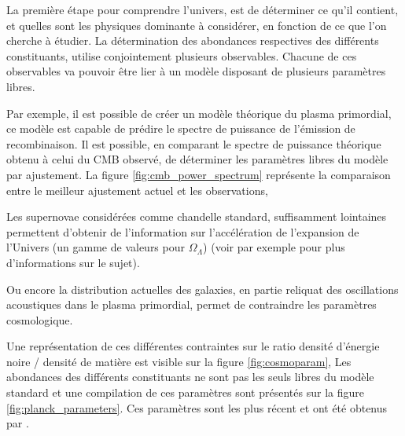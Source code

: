 La première étape pour comprendre l'univers, est de déterminer ce qu'il contient, et quelles sont les physiques dominante à considérer, en fonction de ce que l'on cherche à étudier.
La détermination des abondances respectives des différents constituants, utilise conjointement plusieurs observables.
Chacune de ces observables va pouvoir être lier à un modèle disposant de plusieurs paramètres libres.

Par exemple, il est possible de créer un modèle théorique du plasma primordial, ce modèle est capable de prédire le spectre de puissance de l'émission de recombinaison.
Il est possible, en comparant le spectre de puissance théorique obtenu à celui du \ac{CMB} observé, de déterminer les paramètres libres du modèle par ajustement.
La figure \ref{fig:cmb_power_spectrum} représente la comparaison entre le meilleur ajustement actuel et les observations, 

Les supernovae considérées comme chandelle standard, suffisamment lointaines permettent d'obtenir de l'information sur l'accélération de l'expansion de l'Univers (un gamme de valeurs pour $\Omega_\Lambda$)
(voir par exemple \cite{1999ApJ...517..565P} pour plus d'informations sur le sujet).

Ou encore la distribution actuelles des galaxies, en partie reliquat des oscillations acoustiques dans le plasma primordial, permet de contraindre les paramètres cosmologique.



Une représentation de ces différentes contraintes sur le ratio densité d'énergie noire / densité de matière est visible sur la figure \ref{fig:cosmoparam},
Les abondances des différents constituants ne sont pas les seuls libres du modèle standard et une compilation de ces paramètres sont présentés sur la figure \ref{fig:planck_parameters}.
Ces paramètres sont les plus récent et ont été obtenus par \cite{planck_collaboration_planck_2016}.



